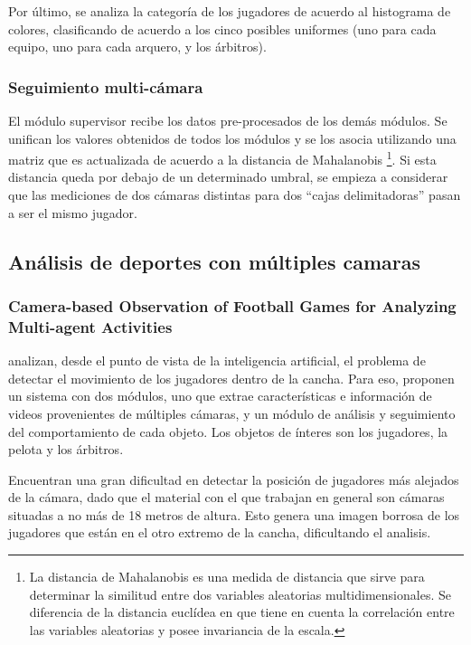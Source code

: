 \documentclass[a4paper,10pt]{article}
\begin{document}
Por último, se analiza la categoría de los
jugadores de acuerdo al histograma de colores, clasificando de acuerdo a los
cinco posibles uniformes (uno para cada equipo, uno para cada arquero, y los
árbitros).

\subsubsection{Seguimiento multi-cámara}

El módulo supervisor recibe los datos pre-procesados de los demás módulos.
Se unifican los valores obtenidos
de todos los módulos y se los asocia utilizando una matriz que es actualizada
de acuerdo a la distancia de Mahalanobis \footnote {La distancia de Mahalanobis
es una medida de distancia que sirve para determinar la similitud entre dos
variables aleatorias multidimensionales. Se diferencia de la distancia
euclídea en que tiene en cuenta la correlación entre
las variables aleatorias y posee invariancia de la escala.}. Si esta distancia queda por debajo de
un determinado umbral, se empieza a considerar que las mediciones de dos
cámaras distintas para dos ``cajas delimitadoras'' pasan a ser el mismo
jugador.

\subsection{Análisis de deportes con múltiples camaras}
\label{sec:var-camaras}

\subsubsection{Camera-based Observation of Football Games for Analyzing Multi-agent Activities}

\citeauthor*{beetz-05} analizan, desde el punto de vista de la inteligencia
artificial, el problema de detectar el movimiento de los jugadores dentro
de la cancha. Para eso, proponen un sistema con dos módulos, uno que extrae
características e información de videos provenientes de múltiples cámaras, y
un módulo de análisis y seguimiento del comportamiento de cada objeto.
Los objetos de ínteres son los jugadores, la pelota y los árbitros.

Encuentran una gran dificultad en detectar la posición de jugadores más alejados de la cámara,
dado que el material con el que trabajan en general son cámaras situadas a no más de 18
metros de altura. Esto genera una imagen borrosa de los jugadores que están
en el otro extremo de la cancha, dificultando el analisis.
\end{document}
